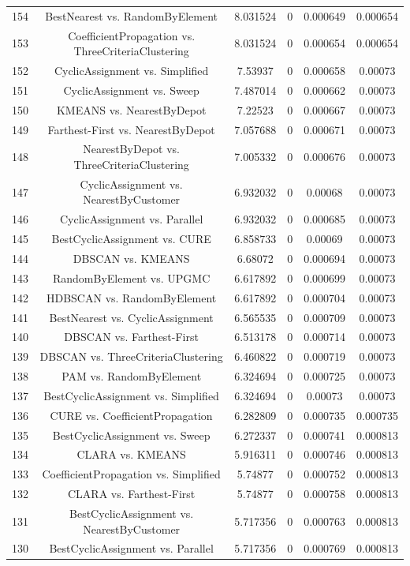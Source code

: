 \documentclass[a4paper,10pt]{article}
\begin{document}
\begin{landscape}
\begin{table}[!htp]
\begin{tabular}{cccccc}
154&BestNearest vs. RandomByElement&8.031524&0&0.000649&0.000654\\
153&CoefficientPropagation vs. ThreeCriteriaClustering&8.031524&0&0.000654&0.000654\\
152&CyclicAssignment vs. Simplified&7.53937&0&0.000658&0.00073\\
151&CyclicAssignment vs. Sweep&7.487014&0&0.000662&0.00073\\
150&KMEANS vs. NearestByDepot&7.22523&0&0.000667&0.00073\\
149&Farthest-First vs. NearestByDepot&7.057688&0&0.000671&0.00073\\
148&NearestByDepot vs. ThreeCriteriaClustering&7.005332&0&0.000676&0.00073\\
147&CyclicAssignment vs. NearestByCustomer&6.932032&0&0.00068&0.00073\\
146&CyclicAssignment vs. Parallel&6.932032&0&0.000685&0.00073\\
145&BestCyclicAssignment vs. CURE&6.858733&0&0.00069&0.00073\\
144&DBSCAN vs. KMEANS&6.68072&0&0.000694&0.00073\\
143&RandomByElement vs. UPGMC&6.617892&0&0.000699&0.00073\\
142&HDBSCAN vs. RandomByElement&6.617892&0&0.000704&0.00073\\
141&BestNearest vs. CyclicAssignment&6.565535&0&0.000709&0.00073\\
140&DBSCAN vs. Farthest-First&6.513178&0&0.000714&0.00073\\
139&DBSCAN vs. ThreeCriteriaClustering&6.460822&0&0.000719&0.00073\\
138&PAM vs. RandomByElement&6.324694&0&0.000725&0.00073\\
137&BestCyclicAssignment vs. Simplified&6.324694&0&0.00073&0.00073\\
136&CURE vs. CoefficientPropagation&6.282809&0&0.000735&0.000735\\
135&BestCyclicAssignment vs. Sweep&6.272337&0&0.000741&0.000813\\
134&CLARA vs. KMEANS&5.916311&0&0.000746&0.000813\\
133&CoefficientPropagation vs. Simplified&5.74877&0&0.000752&0.000813\\
132&CLARA vs. Farthest-First&5.74877&0&0.000758&0.000813\\
131&BestCyclicAssignment vs. NearestByCustomer&5.717356&0&0.000763&0.000813\\
130&BestCyclicAssignment vs. Parallel&5.717356&0&0.000769&0.000813\\

\end{tabular}
\end{table}
\end{landscape}
\end{document}
